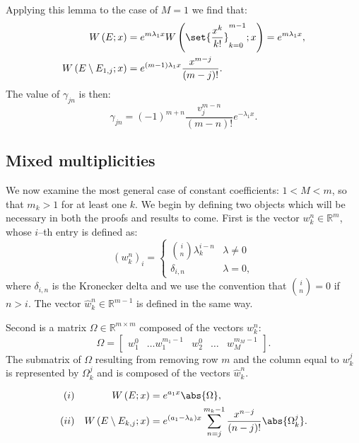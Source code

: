 \documentclass{article}
\begin{document}
Applying this lemma to the case of $M=1$ we find that:
\begin{align*}
\W{E}{x} & = e^{m \lambda_1 x} \W{\set{\Poly{k}}_{k=0}^{m-1}}{x} = e^{m \lambda_1 x} , \\
\W{E \setminus E_{1,j}}{x} & = e^{(m-1) \lambda_1 x} \poly{m-j} .
\end{align*}
The value of $\gamma_{jn}$ is then:
\begin{equation*}
\gamma_{jn} = (-1)^{m+n} \frac{v_j^{m-n}}{(m-n)!} e^{-\lambda_1 x} .
\end{equation*}

\subsection{Mixed multiplicities}


We now examine the most general case of constant coefficients: $1 < M < m$, so that $m_k > 1$ for at least one $k$.
We begin by defining two objects which will be necessary in both the proofs and results to come.
First is the vector $w_k^n \in \mathbb{R}^m$, whose $i$--th entry is defined as:
\begin{equation*}
\left ( w_k^n \right )_i = \begin{cases} \binom{i}{n} \lambda_k^{i - n} & \lambda \neq 0 \\
\delta_{i,n} & \lambda = 0, \end{cases}
\end{equation*}
where $\delta_{i,n}$ is the Kronecker delta and we use the convention that $\binom{i}{n} = 0$ if $n>i$.
The vector $\hat{w}_k^n \in \mathbb{R}^{m-1}$ is defined in the same way.

Second is a matrix $\Omega \in \mathbb{R}^{m \times m}$ composed of the vectors $w_k^n$:
\begin{equation*}
\Omega = \begin{bmatrix} w_1^0 & \dots w_1^{m_1 - 1} & w_2^0 & \dots & w_M^{m_M-1} \end{bmatrix} .
\end{equation*}
The submatrix of $\Omega$ resulting from removing row $m$ and the column equal to $w_k^j$ is represented by $\Omega_k^j$ and is composed of the vectors $\hat{w}_k^n$.

\begin{lemma}
\begin{align*}
(i) && \W{E}{x} & = e^{a_1 x} \abs{\Omega}, \\
(ii) && \W{E \setminus E_{k,j}}{x} & = e^{(a_1 - \lambda_k) x} \sum_{n=j}^{m_k - 1} \poly{n-j} \abs{\Omega_k^j} .
\end{align*}
\end{lemma}
\end{document}
